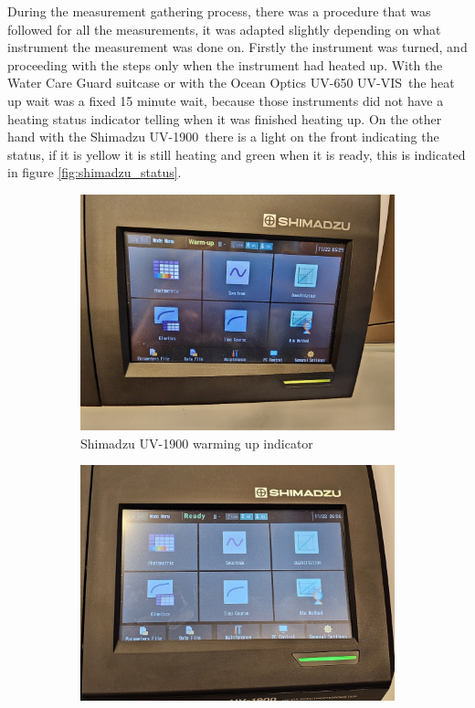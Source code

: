 \documentclass{article}
\begin{document}
During the measurement gathering process, there was a procedure that was followed for all the measurements, it was adapted slightly depending on what instrument the measurement was done on.
Firstly the instrument was turned, and proceeding with the steps only when the instrument had heated up.
With the Water Care Guard suitcase or with the Ocean Optics UV-650 UV-VIS\texttrademark\, the heat up wait was a fixed 15 minute wait, because those instruments did not have a heating status indicator telling when it was finished heating up.
On the other hand with the Shimadzu UV-1900\texttrademark\, there is a light on the front indicating the status, if it is yellow it is still heating and green when it is ready, this is indicated in figure \ref{fig:shimadzu_status}.

\begin{figure}[H]
    \centering
    \begin{subfigure}[b]{0.48\textwidth}
        \centering
        \includegraphics[width=\textwidth]{shimadzu_heating.jpg}
        \caption{Shimadzu UV-1900 warming up indicator}
        \label{fig:shimadzu_heating}
    \end{subfigure}
    \hfill
    \begin{subfigure}[b]{0.48\textwidth}
       \centering 
       \includegraphics[width=\textwidth]{shimadzu_ready.jpg}

\end{subfigure}
\end{figure}
\end{document}

